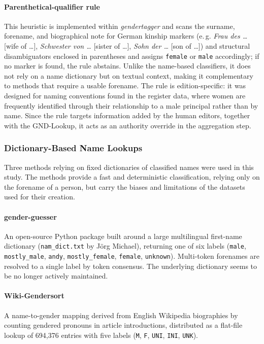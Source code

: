 \documentclass{eceasst}
\newcommand{\eg}{e.\,g.}
\begin{document}
\paragraph{Parenthetical-qualifier rule} This heuristic is implemented within \textit{gendertagger} and scans the surname, forename, and biographical note for German kinship markers (\eg{} \textit{Frau des \dots} [wife of \dots], \textit{Schwester von \dots} [sister of \dots], \textit{Sohn der \dots} [son of \dots]) and structural disambiguators enclosed in parentheses and assigns \texttt{female} or \texttt{male} accordingly; if no marker is found, the rule abstains. Unlike the name-based classifiers, it does not rely on a name dictionary but on textual context, making it complementary to methods that require a usable forename. The rule is edition-specific: it was designed for naming conventions found in the register data, where women are frequently identified through their relationship to a male principal rather than by name. Since the rule targets information added by the human editors, together with the GND-Lookup, it acts as an authority override in the aggregation step.

\subsubsection{Dictionary-Based Name Lookups}

Three methods relying on fixed dictionaries of classified names were used in this study. The methods provide a fast and deterministic classification, relying only on the forename of a person, but carry the biases and limitations of the datasets used for their creation.

\paragraph{gender-guesser} An open-source Python package built around a large multilingual first-name dictionary (\texttt{nam\_dict.txt} by Jörg Michael), returning one of six labels (\texttt{male}, \texttt{mostly\_male}, \texttt{andy}, \texttt{mostly\_female}, \texttt{female}, \texttt{unknown}). Multi-token forenames are resolved to a single label by token consensus. The underlying dictionary seems to be no longer actively maintained.~\cite{perez_gender-guesser_2016}

\paragraph{Wiki-Gendersort} A name-to-gender mapping derived from English Wikipedia biographies by counting gendered pronouns in article introductions, distributed as a flat-file lookup of 694{,}376 entries with five labels (\texttt{M}, \texttt{F}, \texttt{UNI}, \texttt{INI}, \texttt{UNK}).~\cite{berube_wiki-gendersort_2020,berube_wiki-gendersort_2020-1}
\end{document}
